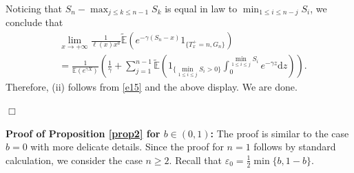 \documentclass[11pt]{article}
\numberwithin{equation}{section}
\begin{document}
Noticing that $S_n- \max_{j\leq k\leq n-1} S_k$ is equal in law to $\min_{1\leq i\leq n-j} S_i$, we conclude that 
\begin{align}
	& \lim_{x\to+\infty} \frac{1}{\ell(x)x^a}\widetilde{\mathbb{E}}\left(e^{-\gamma (S_n-x)}1_{\{T_x^+=n, G_n\}}\right)   \nonumber\\
	&= \frac{1}{\mathbb{E}(e^{\gamma X})} \left(\frac{1}{\gamma}+ \sum_{j=1}^{n-1}\widetilde{\mathbb{E}}\left(1_{\{\min_{1\leq i\leq j} S_i>0 \}}\int_0^{\min_{1\leq i\leq j} S_i} e^{-\gamma z}\mathrm{d} z\right) \right).
\end{align}
Therefore, (ii) follows from \eqref{e15} and the above display. We are done. 

\hfill$\Box$


\noindent
\textbf{Proof of Proposition \ref{prop2}  for $b\in (0,1)$:}  The proof is similar to the case $b=0$ with more delicate details. Since the proof for $n=1$ follows by standard calculation,   we consider the case $n\geq 2$.  Recall that $\varepsilon_0= \frac{1}{2}\min\{ b, 1-b\}$. 
\end{document}
